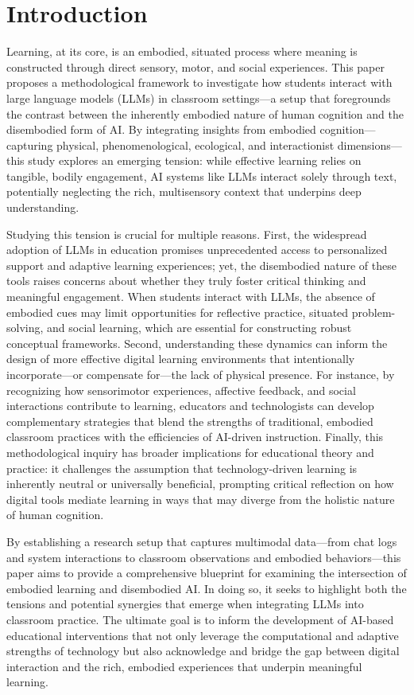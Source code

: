 \documentclass[pdflatex,sn-apa]{sn-jnl}%
\theoremstyle{thmstyleone}%
\theoremstyle{thmstyletwo}%
\theoremstyle{thmstylethree}%
\begin{document}
\section{Introduction}\label{introduction}
Learning, at its core, is an embodied, situated process where meaning is constructed through direct sensory, motor, and social experiences. This paper proposes a methodological framework to investigate how students interact with large language models (LLMs) in classroom settings—a setup that foregrounds the contrast between the inherently embodied nature of human cognition and the disembodied form of AI. By integrating insights from embodied cognition—capturing physical, phenomenological, ecological, and interactionist dimensions—this study explores an emerging tension: while effective learning relies on tangible, bodily engagement, AI systems like LLMs interact solely through text, potentially neglecting the rich, multisensory context that underpins deep understanding.

Studying this tension is crucial for multiple reasons. First, the widespread adoption of LLMs in education promises unprecedented access to personalized support and adaptive learning experiences; yet, the disembodied nature of these tools raises concerns about whether they truly foster critical thinking and meaningful engagement. When students interact with LLMs, the absence of embodied cues may limit opportunities for reflective practice, situated problem-solving, and social learning, which are essential for constructing robust conceptual frameworks. Second, understanding these dynamics can inform the design of more effective digital learning environments that intentionally incorporate—or compensate for—the lack of physical presence. For instance, by recognizing how sensorimotor experiences, affective feedback, and social interactions contribute to learning, educators and technologists can develop complementary strategies that blend the strengths of traditional, embodied classroom practices with the efficiencies of AI-driven instruction. Finally, this methodological inquiry has broader implications for educational theory and practice: it challenges the assumption that technology-driven learning is inherently neutral or universally beneficial, prompting critical reflection on how digital tools mediate learning in ways that may diverge from the holistic nature of human cognition.

By establishing a research setup that captures multimodal data—from chat logs and system interactions to classroom observations and embodied behaviors—this paper aims to provide a comprehensive blueprint for examining the intersection of embodied learning and disembodied AI. In doing so, it seeks to highlight both the tensions and potential synergies that emerge when integrating LLMs into classroom practice. The ultimate goal is to inform the development of AI-based educational interventions that not only leverage the computational and adaptive strengths of technology but also acknowledge and bridge the gap between digital interaction and the rich, embodied experiences that underpin meaningful learning.
\end{document}
